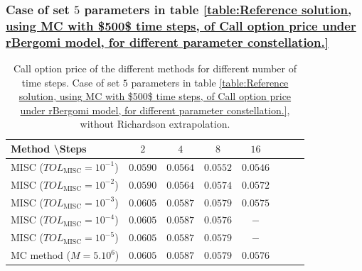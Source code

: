 \subsubsection{Case of set $5$ parameters in table \ref{table:Reference solution, using MC with $500$ time steps, of Call option price under rBergomi model, for different parameter constellation.}}\label{sec:Case of set 5 parameters}

\begin{table}[h!]
	\centering
	\begin{tabular}{l*{6}{c}r}
		Method \textbackslash  Steps            & $2$ & $4$ & $8$ & $16$ &   \\
		\hline
		MISC ($TOL_{\text{MISC}}=10^{-1}$)  & $0.0590$ &$0.0564$& $0.0552$ & $0.0546$   \\
		MISC ($TOL_{\text{MISC}}=10^{-2}$)  &$0.0590$ &$0.0564$ & $0.0574$ & $0.0572$  \\
		
		MISC ($TOL_{\text{MISC}}=10^{-3}$)  & $0.0605$ & $0.0587$ & $0.0579$ & $0.0575$  \\
		MISC ($TOL_{\text{MISC}}=10^{-4}$)  &  $0.0605$ & $0.0587$ & $0.0576$ & $-$  \\
		
		MISC ($TOL_{\text{MISC}}=10^{-5}$)  & $0.0605$ & $0.0587$ &  $0.0579$ & $-$  \\
		\hline
		MC method ($M=5.10^{6}$)   & $0.0605$ & $0.0587$  & $0.0579$ & $0.0576$ \\		
		
		\hline
	\end{tabular}
	\caption{ Call option price of the different methods for different number of time steps. Case of set $5$ parameters in table \ref{table:Reference solution, using MC with $500$ time steps, of Call option price under rBergomi model, for different parameter constellation.}, without Richardson extrapolation.}
	\label{table: Call option price of the different methods for different number of time steps. Case set 5}
\end{table}


